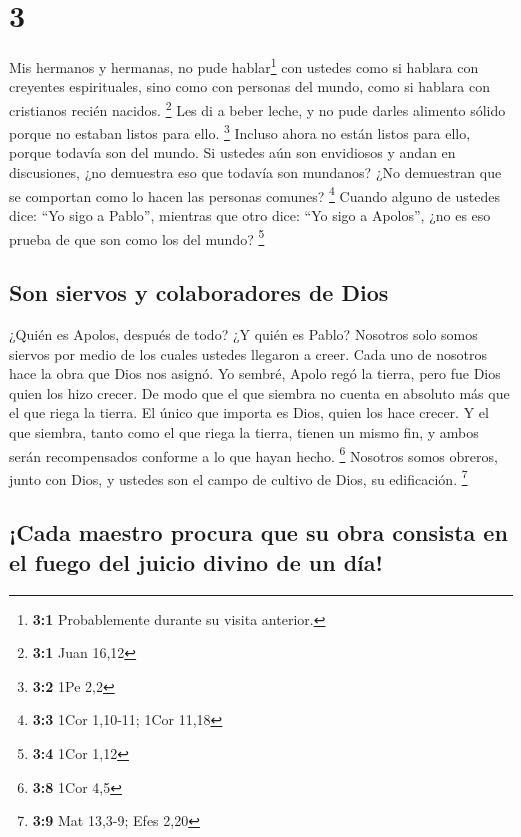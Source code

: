 \hypertarget{section-2}{%
\section{3}\label{section-2}}

 Mis hermanos y hermanas, no pude hablar\footnote{\textbf{3:1}
  Probablemente durante su visita anterior.} con ustedes como si hablara
con creyentes espirituales, sino como con personas del mundo, como si
hablara con cristianos recién nacidos. \footnote{\textbf{3:1} Juan 16,12}
 Les di a beber leche, y no pude darles alimento sólido
porque no estaban listos para ello. \footnote{\textbf{3:2} 1Pe 2,2}
 Incluso ahora no están listos para ello, porque todavía
son del mundo. Si ustedes aún son envidiosos y andan en discusiones, ¿no
demuestra eso que todavía son mundanos? ¿No demuestran que se comportan
como lo hacen las personas comunes? \footnote{\textbf{3:3} 1Cor 1,10-11;
  1Cor 11,18}  Cuando alguno de ustedes dice: ``Yo sigo a
Pablo'', mientras que otro dice: ``Yo sigo a Apolos'', ¿no es eso prueba
de que son como los del mundo? \footnote{\textbf{3:4} 1Cor 1,12}

\hypertarget{son-siervos-y-colaboradores-de-dios}{%
\subsection{Son siervos y colaboradores de
Dios}\label{son-siervos-y-colaboradores-de-dios}}

 ¿Quién es Apolos, después de todo? ¿Y quién es Pablo?
Nosotros solo somos siervos por medio de los cuales ustedes llegaron a
creer. Cada uno de nosotros hace la obra que Dios nos asignó.
 Yo sembré, Apolo regó la tierra, pero fue Dios quien los
hizo crecer.  De modo que el que siembra no cuenta en
absoluto más que el que riega la tierra. El único que importa es Dios,
quien los hace crecer.  Y el que siembra, tanto como el
que riega la tierra, tienen un mismo fin, y ambos serán recompensados
conforme a lo que hayan hecho. \footnote{\textbf{3:8} 1Cor 4,5}
 Nosotros somos obreros, junto con Dios, y ustedes son el
campo de cultivo de Dios, su edificación. \footnote{\textbf{3:9} Mat
  13,3-9; Efes 2,20}

\hypertarget{cada-maestro-procura-que-su-obra-consista-en-el-fuego-del-juicio-divino-de-un-duxeda}{%
\subsection{¡Cada maestro procura que su obra consista en el fuego del
juicio divino de un
día!}\label{cada-maestro-procura-que-su-obra-consista-en-el-fuego-del-juicio-divino-de-un-duxeda}}

